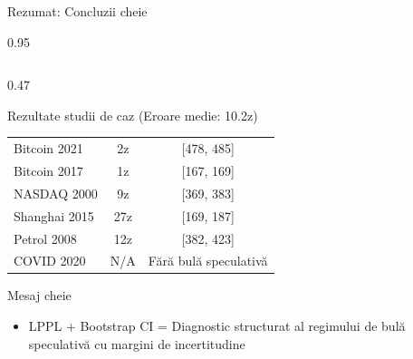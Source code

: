 \documentclass[9pt, aspectratio=169, t]{beamer}
\begin{document}
\begin{frame}{Rezumat: Concluzii cheie}
\begin{cminipage}{0.95\textwidth}
{\begin{columns}[T]
\begin{column}{0.47\textwidth}
\begin{exampleblock}{Rezultate studii de caz (Eroare medie: 10.2z)}
{\begin{center}
\begin{tabular}{lcc}
                        \midrule
                        Bitcoin 2021 & 2z & [478, 485] \\
                        Bitcoin 2017 & 1z & [167, 169] \\
                        NASDAQ 2000 & 9z & [369, 383] \\
                        Shanghai 2015 & 27z & [169, 187] \\
                        Petrol 2008 & 12z & [382, 423] \\
                        COVID 2020 & N/A & Fără bulă speculativă \\
                        \bottomrule
                    \end{tabular}
                \end{center}
                }
            \end{exampleblock}
            \vspace{-2mm}
            \begin{block}{Mesaj cheie}
                \begin{itemize}\setlength{\itemsep}{0pt}
                    \item LPPL + Bootstrap CI = Diagnostic structurat al regimului de bulă speculativă cu margini de incertitudine
                \end{itemize}
            \end{block}
        \end{column}
    \end{columns}
    }
    \end{cminipage}
\end{frame}
\end{document}
